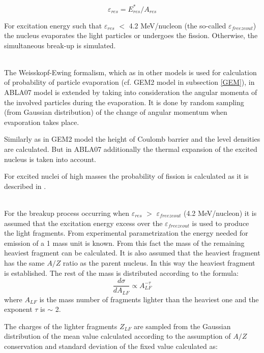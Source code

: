 \begin{equation}
\varepsilon_{res} = E_{res}^{*}/A_{res}
\end{equation}

For excitation energy such that $\varepsilon_{res}$ $<$ 4.2 MeV/nucleon (the so-called $\varepsilon_{freezeout}$) 
the nucleus evaporates the light particles or undergoes the  fission. Otherwise, the simultaneous break-up is simulated. 

 \ \\
 
The Weisskopf-Ewing formalism, which as in other models is used for calculation of probability of particle evaporation (cf. GEM2 model in subsection \ref{GEM}), in ABLA07 model is extended by taking into consideration the angular momenta of the involved particles during the evaporation. It is done by random sampling (from Gaussian distribution) of the change of angular momentum when evaporation takes place.

Similarly as in GEM2 model the height 
of Coulomb barrier and the level densities are calculated. But in ABLA07 additionally the thermal expansion of the excited nucleus 
is taken into account. 

For excited nuclei of high masses the probability of fission is calculated as it is  described in \cite{kelic2009abla07}. 

 \ \\
 
For the breakup process occurring when $\varepsilon_{res}$ $ > $ $\varepsilon_{freezeout}$  (4.2 MeV/nucleon) it is assumed that the excitation energy excess over the $\varepsilon_{freezeout}$ is used to produce the  light fragments. From experimental parametrization the energy needed for emission of a 1 mass unit is known. From this fact 
the mass of the remaining heaviest fragment can be calculated. It is also assumed 
that the heaviest fragment has the same $A/Z$ ratio as the parent nucleus. In this way the heaviest fragment is established. The rest of the mass is distributed according to the  formula:
\begin{equation}
	\frac{d\sigma}{dA_{LF}}\propto A_{LF}^{-\tau}
\end{equation}
where $A_{LF}$ is the mass number of fragments lighter than the heaviest one and the 
exponent $\tau$ is $\sim$ 2.

The charges of the lighter fragments $Z_{LF}$  are sampled from the Gaussian distribution of the mean value calculated according to the assumption of $A/Z$ conservation and standard deviation of the fixed value calculated as:

